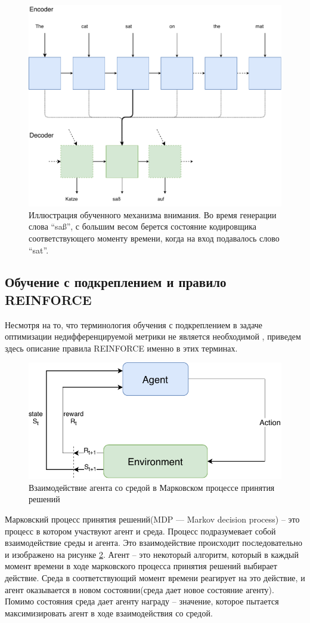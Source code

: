 \documentclass[14pt, a4paper]{extarticle}
\begin{document}
\begin{figure}[h]
\centering
\includegraphics[width=0.7\linewidth]{attention.pdf}
\caption{Иллюстрация обученного механизма внимания. Во время генерации слова ``saß'', с большим весом берется состояние
 кодировщика соответствующего моменту времени, когда на вход подавалось слово ``sat''.}
\label{fig:attention}
\end{figure}


\subsection{Обучение с подкреплением и правило REINFORCE}
Несмотря на то, что терминология обучения с подкреплением в задаче оптимизации недифференцируемой метрики не является необходимой \cite{Minimum_Risk},
приведем здесь описание правила REINFORCE именно в этих терминах.

\begin{figure}[h]
\centering
\includegraphics[width=0.5\linewidth]{MDP.pdf}
\caption{Взаимодействие агента со средой в Марковском процессе принятия решений}
\label{fig:MDP}
\end{figure}


Марковский процесс принятия решений(MDP --- Markov decision process) -- это процесс в котором участвуют агент и среда.
Процесс подразумевает собой взаимодействие среды и агента. Это взаимодействие происходит последовательно и изображено на рисунке \ref{fig:MDP}.
Агент -- это некоторый алгоритм, который в каждый момент времени в ходе марковского процесса принятия решений выбирает действие. Среда в соответствующий момент времени реагирует на это действие,
и агент оказывается в новом состоянии(среда дает новое состояние агенту). Помимо состояния среда дает агенту награду -- значение, которое
пытается максимизировать агент в ходе взаимодействия со средой.
\end{document}
